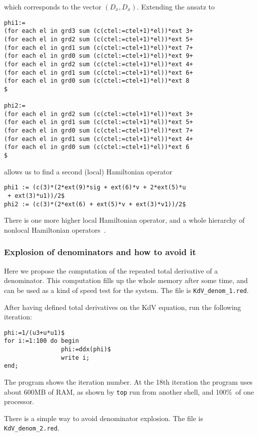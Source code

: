 which corresponds to the vector $(D_x,D_x)$.  Extending the ansatz to
\begin{verbatim}
phi1:=
(for each el in grd3 sum (c(ctel:=ctel+1)*el))*ext 3+
(for each el in grd2 sum (c(ctel:=ctel+1)*el))*ext 5+
(for each el in grd1 sum (c(ctel:=ctel+1)*el))*ext 7+
(for each el in grd0 sum (c(ctel:=ctel+1)*el))*ext 9+
(for each el in grd2 sum (c(ctel:=ctel+1)*el))*ext 4+
(for each el in grd1 sum (c(ctel:=ctel+1)*el))*ext 6+
(for each el in grd0 sum (c(ctel:=ctel+1)*el))*ext 8
$

phi2:=
(for each el in grd2 sum (c(ctel:=ctel+1)*el))*ext 3+
(for each el in grd1 sum (c(ctel:=ctel+1)*el))*ext 5+
(for each el in grd0 sum (c(ctel:=ctel+1)*el))*ext 7+
(for each el in grd1 sum (c(ctel:=ctel+1)*el))*ext 4+
(for each el in grd0 sum (c(ctel:=ctel+1)*el))*ext 6
$
\end{verbatim}
allows us to find a second (local) Hamiltonian operator
\begin{verbatim}
phi1 := (c(3)*(2*ext(9)*sig + ext(6)*v + 2*ext(5)*u
 + ext(3)*u1))/2$
phi2 := (c(3)*(2*ext(6) + ext(5)*v + ext(3)*v1))/2$
\end{verbatim}
There is one more higher local Hamiltonian operator, and a whole hierarchy of
nonlocal Hamiltonian operators~\cite{KKV}.


\subsubsection{Explosion of denominators and how to avoid it}

Here we propose the computation of the repeated total derivative of a
denominator. This computation fills up the whole memory after some time, and
can be used as a kind of speed test for the system. The file is
\texttt{KdV\_denom\_1.red}.

After having defined total derivatives on the KdV equation, run the following
iteration:
\begin{verbatim}
phi:=1/(u3+u*u1)$
for i:=1:100 do begin
                phi:=ddx(phi)$
                write i;
end;
\end{verbatim}
The program shows the iteration number. At the 18th iteration the program uses
about 600MB of RAM, as shown by \texttt{top} run from another shell, and 100\%\
of one processor.

There is a simple way to avoid denominator explosion. The file is
\texttt{KdV\_denom\_2.red}.

